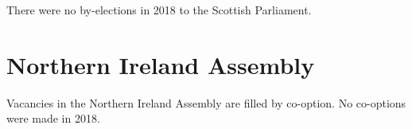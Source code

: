 There were no by-elections in 2018 to the Scottish Parliament.
%
%
%
%
%
%
%

\section{Northern Ireland Assembly}

Vacancies in the Northern Ireland Assembly are filled by co-option.
No co-options were made in 2018.
%

